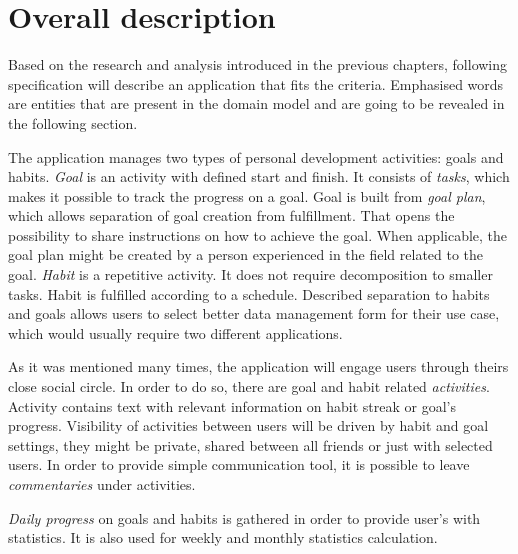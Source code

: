 
\section{Overall description}\label{sec:overall-description}

Based on the research and analysis introduced in the previous chapters, following specification will describe an application that fits the criteria.
Emphasised words are entities that are present in the domain model and are going to be revealed in the following section.

The application manages two types of personal development activities: goals and habits.
\textit{Goal} is an activity with defined start and finish.
It consists of \textit{tasks}, which makes it possible to track the progress on a goal.
Goal is built from \textit{goal plan}, which allows separation of goal creation from fulfillment.
That opens the possibility to share instructions on how to achieve the goal.
When applicable, the goal plan might be created by a person experienced in the field related to the goal.
\textit{Habit} is a repetitive activity.
It does not require decomposition to smaller tasks.
Habit is fulfilled according to a schedule.
Described separation to habits and goals allows users to select better data management form for their use case, which would usually require two different applications.

As it was mentioned many times, the application will engage users through theirs close social circle.
In order to do so, there are goal and habit related \textit{activities}.
Activity contains text with relevant information on habit streak or goal's progress.
Visibility of activities between users will be driven by habit and goal settings, they might be private, shared between all friends or just with selected users.
In order to provide simple communication tool, it is possible to leave \textit{commentaries} under activities.

\textit{Daily progress} on goals and habits is gathered in order to provide user's with statistics.
It is also used for weekly and monthly statistics calculation.